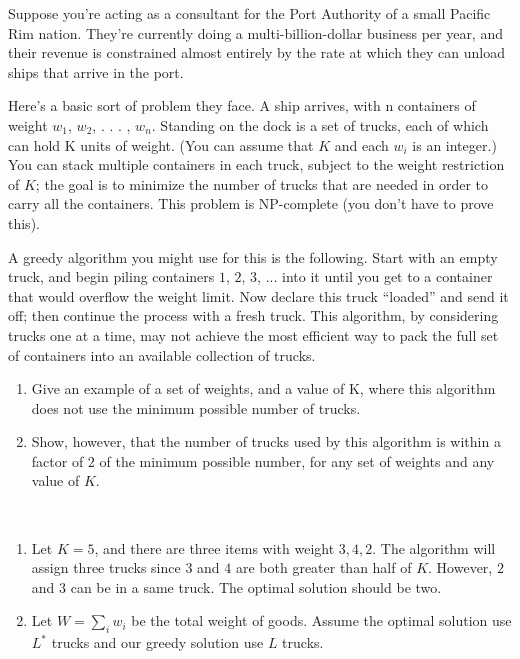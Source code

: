 \begin{exercise}[]{Suppose you’re acting as a consultant for the Port Authority of a small Pacific Rim nation. They’re currently doing a multi-billion-dollar business per year, and their revenue is constrained almost entirely by the rate at which they can unload ships that arrive in the port.

    Here’s a basic sort of problem they face. A ship arrives, with n containers of weight $w_1$, $w_2$, . . . , $w_n$. Standing on the dock is a set of trucks, each of which can hold K units of weight. (You can assume that $K$ and each $w_i$ is an integer.) You can stack multiple containers in each truck, subject to the weight restriction of $K$; the goal is to minimize the number of trucks that are needed in order to carry all the containers. This problem is NP-complete (you don’t have to prove this).
    
    A greedy algorithm you might use for this is the following. Start with an empty truck, and begin piling containers $1$, $2$, $3$, ... into it until you get to a container that would overflow the weight limit. Now declare this truck “loaded” and send it off; then continue the process with a fresh truck. This algorithm, by considering trucks one at a time, may not achieve the most efficient way to pack the full set of containers into an available collection of trucks.
    
    \begin{enumerate}
        \item Give an example of a set of weights, and a value of K, where this algorithm does not use the minimum possible number of trucks.
        \item Show, however, that the number of trucks used by this algorithm is within a factor of $2$ of the minimum possible number, for any set of weights and any value of $K$.
    \end{enumerate}}
  \begin{solution}
    \par{~}
    \begin{enumerate}
      \item Let $K=5$, and there are three items with weight $3,4,2$. The algorithm will assign three trucks since $3$ and $4$ are both greater than half of $K$. However, $2$ and $3$ can be in a same truck. The optimal solution should be two.
      \item Let $W=\sum_{i}w_i$ be the total weight of goods. Assume the optimal solution use $L^{*}$ trucks and our greedy solution use $L$ trucks. 
      

\end{enumerate}
\end{solution}
\end{exercise}
